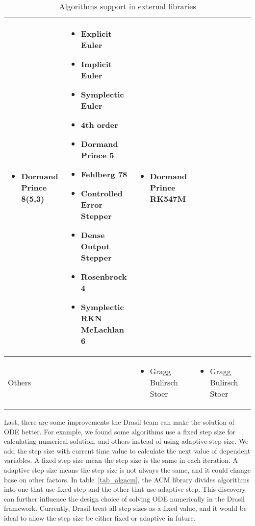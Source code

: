 \begin{sidewaystable}
\begin{adjustbox}{width=\columnwidth,center}
\begin{tabular}{p{} | p{} p{} p{} p{}}
\begin{itemize}[wide]
        \item Dormand Prince 8(5,3) 
        \end{itemize} & 
        \begin{itemize}[wide]
        \item Explicit Euler
        \item Implicit Euler
        \item Symplectic Euler
        \item 4th order
        \item Dormand Prince 5
        \item Fehlberg 78
        \item Controlled Error Stepper
        \item Dense Output Stepper
        \item Rosenbrock 4
        \item Symplectic RKN McLachlan 6
        \end{itemize} & 
        \begin{itemize}[wide]
        \item Dormand Prince RK547M
        \end{itemize} \\ \hline
    Others && 
        \begin{itemize}[wide]
        \item Gragg Bulirsch Stoer 
        \end{itemize} & 
        \begin{itemize}[wide]
        \item Gragg Bulirsch Stoer 
        \end{itemize} &\\
    \bottomrule	
\end{tabular}
\end{adjustbox}
\caption{Algorithms support in external libraries}	
\label{tab_algoexlib}
\end{sidewaystable}

Last, there are some improvements the Drasil team can make the solution of ODE better. For example, we found some algorithms use a fixed step size for calculating numerical solution, and others instead of using adaptive step size. We add the step size with current time value to calculate the next value of dependent variables. A fixed step size mean the step size is the same in each iteration. A adaptive step size means the step size is not always the same, and it could change base on other factors. In table~\ref{tab_algacm}, the ACM library divides algorithms into one that use fixed step and the other that use adaptive step. This discovery can further influence the design choice of solving ODE numerically in the Drasil framework. Currently, Drasil treat all step sizes as a fixed value, and it would be ideal to allow the step size be either fixed or adaptive in future.

